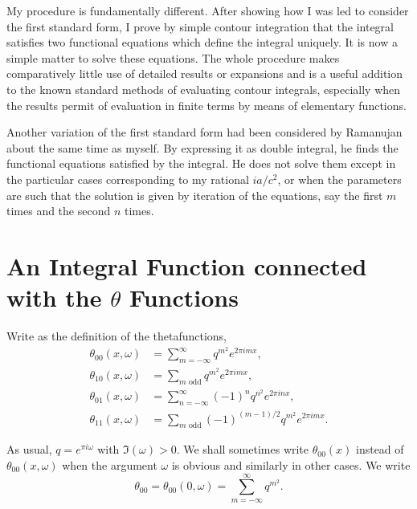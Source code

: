 \documentclass[12pt]{article}
\theoremstyle{remark}
\begin{document}
My procedure is fundamentally different. After showing how I was led to consider the first standard form, I prove by simple contour integration that the integral satisfies two functional equations which define the integral uniquely. It is now a simple matter to solve these equations. The whole procedure makes comparatively little use of detailed results or expansions and is a useful addition to the known standard methods of evaluating contour integrals, especially when the results permit of evaluation in finite terms by means of elementary functions.

Another variation of the first standard form had been considered by Ramanujan~\cite{Ramanujan1919} about the same time as myself. By expressing it as double integral, he finds the functional equations satisfied by the integral. He does not solve them except in the particular cases corresponding to my rational $ia/c^2$, or when the parameters are such that the solution is given by iteration of the equations, say the first $m$ times and the second $n$ times.

\section{An Integral Function connected with the $\theta$ Functions}\label{sec:integral_function}

Write as the definition of the thetafunctions,
\begin{align}
\theta_{00}(x, \omega) &= \sum_{m=-\infty}^\infty q^{m^2} e^{2\pi imx}, \label{eq:theta00_def}\\
\theta_{10}(x, \omega) &= \sum_{m \text{ odd}} q^{m^2} e^{2\pi imx}, \label{eq:theta10_def}\\
\theta_{01}(x, \omega) &= \sum_{n=-\infty}^\infty (-1)^n q^{n^2} e^{2\pi inx}, \label{eq:theta01_def}\\
\theta_{11}(x, \omega) &= \sum_{m \text{ odd}} (-1)^{(m-1)/2} q^{m^2} e^{2\pi imx}. \label{eq:theta11_def}
\end{align}

As usual, $q = e^{\pi i\omega}$ with $\Im(\omega) > 0$. We shall sometimes write $\theta_{00}(x)$ instead of $\theta_{00}(x, \omega)$ when the argument $\omega$ is obvious and similarly in other cases. We write
\begin{equation}\label{eq:theta00_short}
\theta_{00} = \theta_{00}(0, \omega) = \sum_{m=-\infty}^\infty q^{m^2}.
\end{equation}
\end{document}
